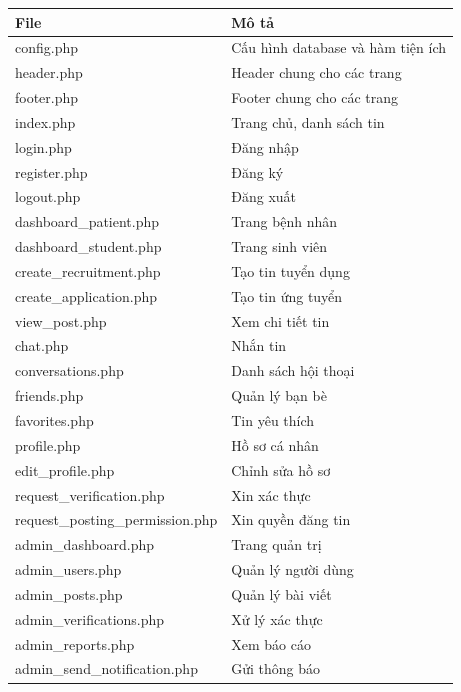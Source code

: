 \documentclass[a4paper,12pt]{report}
\begin{document}
\begin{table}[H]
\centering
\begin{tabular}{|l|l|}
\hline
\textbf{File} & \textbf{Mô tả} \\
\hline
config.php & Cấu hình database và hàm tiện ích \\
header.php & Header chung cho các trang \\
footer.php & Footer chung cho các trang \\
index.php & Trang chủ, danh sách tin \\
login.php & Đăng nhập \\
register.php & Đăng ký \\
logout.php & Đăng xuất \\
dashboard\_patient.php & Trang bệnh nhân \\
dashboard\_student.php & Trang sinh viên \\
create\_recruitment.php & Tạo tin tuyển dụng \\
create\_application.php & Tạo tin ứng tuyển \\
view\_post.php & Xem chi tiết tin \\
chat.php & Nhắn tin \\
conversations.php & Danh sách hội thoại \\
friends.php & Quản lý bạn bè \\
favorites.php & Tin yêu thích \\
profile.php & Hồ sơ cá nhân \\
edit\_profile.php & Chỉnh sửa hồ sơ \\
request\_verification.php & Xin xác thực \\
request\_posting\_permission.php & Xin quyền đăng tin \\
admin\_dashboard.php & Trang quản trị \\
admin\_users.php & Quản lý người dùng \\
admin\_posts.php & Quản lý bài viết \\
admin\_verifications.php & Xử lý xác thực \\
admin\_reports.php & Xem báo cáo \\
admin\_send\_notification.php & Gửi thông báo \\
\hline
\end{tabular}
\end{table}
\end{document}
